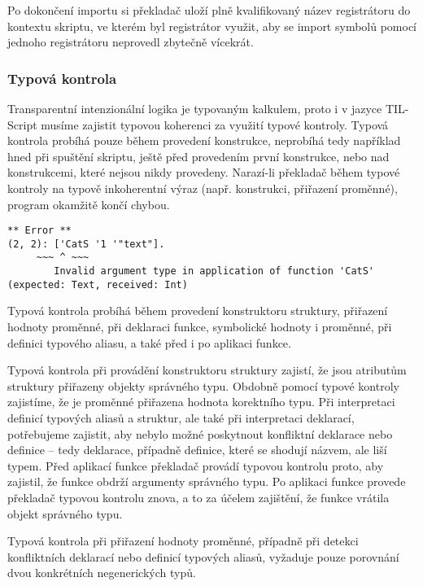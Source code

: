 Po dokončení importu si překladač uloží plně kvalifikovaný název registrátoru do kontextu skriptu,
ve kterém byl registrátor využit, aby se import symbolů pomocí jednoho registrátoru neprovedl
zbytečně vícekrát.

\subsubsection{Typová kontrola}

Transparentní intenzionální logika je typovaným kalkulem, proto i v jazyce TIL-Script musíme
zajistit typovou koherenci za využití typové kontroly. Typová kontrola probíhá pouze během provedení
konstrukce, neprobíhá tedy například hned při spuštění skriptu, ještě před provedením první
konstrukce, nebo nad konstrukcemi, které nejsou nikdy provedeny. Narazí-li překladač během typové
kontroly na typově inkoherentní výraz (např. konstrukci, přiřazení proměnné), program okamžitě
končí chybou.

\begin{lstlisting}[caption={Příklad hlášení chyby}]
  ** Error **
(2, 2): ['CatS '1 '"text"].
     ~~~ ^ ~~~
        Invalid argument type in application of function 'CatS' (expected: Text, received: Int)
\end{lstlisting}

Typová kontrola probíhá během provedení konstruktoru struktury, přiřazení hodnoty proměnné, při
deklaraci funkce, symbolické hodnoty i proměnné, při definici typového aliasu, a také před i
po aplikaci funkce.

Typová kontrola při provádění konstruktoru struktury zajistí, že jsou atributům struktury přiřazeny
objekty správného typu. Obdobně pomocí typové kontroly zajistíme, že je proměnné přiřazena hodnota
korektního typu. Při interpretaci definicí typových aliasů a struktur, ale také při interpretaci
deklarací, potřebujeme zajistit, aby nebylo možné poskytnout konfliktní deklarace nebo definice
-- tedy deklarace, případně definice, které se shodují názvem, ale liší typem. Před aplikací funkce
překladač provádí typovou kontrolu proto, aby zajistil, že funkce obdrží argumenty správného typu.
Po aplikaci funkce provede překladač typovou kontrolu znova, a to za účelem zajištění, že funkce
vrátila objekt správného typu.

Typová kontrola při přiřazení hodnoty proměnné, případně při detekci konfliktních deklarací nebo
definicí typových aliasů, vyžaduje pouze porovnání dvou konkrétních negenerických typů.

